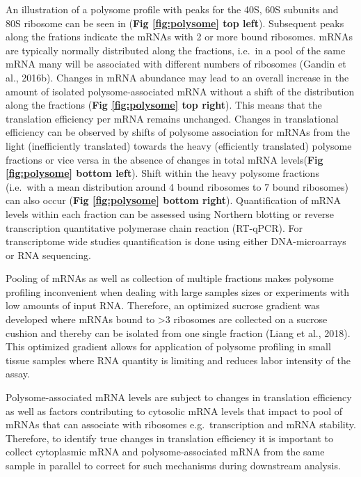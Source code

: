 \documentclass[12pt,openany]{book}
\begin{document}
An illustration of a polysome profile with peaks for the 40S, 60S
subunits and 80S ribosome can be seen in (\textbf{Fig \ref{fig:polysome}
top left}). Subsequent peaks along the frations indicate the mRNAs with
2 or more bound ribosomes. mRNAs are typically normally distributed
along the fractions, i.e.~in a pool of the same mRNA many will be
associated with different numbers of ribosomes (Gandin et al., 2016b).
Changes in mRNA abundance may lead to an overall increase in the amount
of isolated polysome-associated mRNA without a shift of the distribution
along the fractions (\textbf{Fig \ref{fig:polysome} top right}). This
means that the translation efficiency per mRNA remains unchanged.
Changes in translational efficiency can be observed by shifts of
polysome association for mRNAs from the light (inefficiently translated)
towards the heavy (efficiently translated) polysome fractions or vice
versa in the absence of changes in total mRNA levels(\textbf{Fig
\ref{fig:polysome} bottom left}). Shift within the heavy polysome
fractions (i.e.~with a mean distribution around 4 bound ribosomes to 7
bound ribosomes) can also occur (\textbf{Fig \ref{fig:polysome} bottom
right}). Quantification of mRNA levels within each fraction can be
assessed using Northern blotting or reverse transcription quantitative
polymerase chain reaction (RT-qPCR). For transcriptome wide studies
quantification is done using either DNA-microarrays or RNA sequencing.

Pooling of mRNAs as well as collection of multiple fractions makes
polysome profiling inconvenient when dealing with large samples sizes or
experiments with low amounts of input RNA. Therefore, an optimized
sucrose gradient was developed where mRNAs bound to \textgreater{}3
ribosomes are collected on a sucrose cushion and thereby can be isolated
from one single fraction (Liang et al., 2018). This optimized gradient
allows for application of polysome profiling in small tissue samples
where RNA quantity is limiting and reduces labor intensity of the assay.

Polysome-associated mRNA levels are subject to changes in translation
efficiency as well as factors contributing to cytosolic mRNA levels that
impact to pool of mRNAs that can associate with ribosomes
e.g.~transcription and mRNA stability. Therefore, to identify true
changes in translation efficiency it is important to collect cytoplasmic
mRNA and polysome-associated mRNA from the same sample in parallel to
correct for such mechanisms during downstream analysis.
\end{document}
